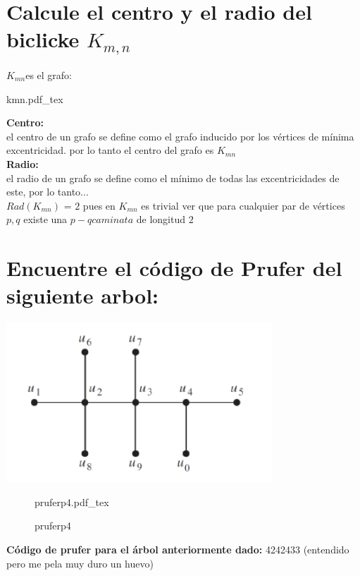 \documentclass[10pt,a4paper]{article} %
\newcommand{\incfig}[1]{%
    \def\svgwidth{\columnwidth}
    {#1.pdf_tex}
}
\begin{document}

    \section{Calcule el centro y el radio del biclicke $K_{m,n}$}
        $K_{mn} $es el grafo:
            \begin{center}
            \incfig{kmn}%
            \end{center}

            \textbf{Centro:}
            \\
            el centro de un grafo se define como el grafo inducido por los
            vértices de mínima excentricidad. por lo tanto el centro del grafo es $K_{mn}$
            \\
            \textbf{Radio:}
            \\
            el radio de un grafo se define como el mínimo de todas las
            excentricidades de este, por lo tanto...
            \\
            $Rad(K_{mn} )$ = $2$ pues en $K_{mn}$ es trivial ver que para
            cualquier par de vértices $p,q$ existe una $p-q caminata$ de
            longitud $2$



    \section{Encuentre el código de Prufer del siguiente arbol:}
        \begin{center}
            \includegraphics[width=0.4\linewidth]{arbolp4}
        \end{center}
            \begin{figure}[ht]
                \centering
                \incfig{pruferp4}
                \caption{pruferp4}
                \label{fig:pruferp4}
            \end{figure}
        \textbf{Código de prufer para el árbol anteriormente dado:}  4242433
            (entendido pero me pela muy duro un huevo)
\end{document}
